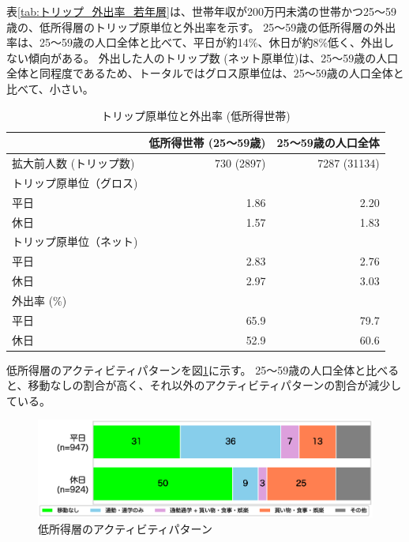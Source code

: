 \documentclass[a4paper,12pt, uplatex]{jsbook}
\begin{document}
表\ref{tab:トリップ_外出率_若年層}は、世帯年収が200万円未満の世帯かつ25〜59歳の、低所得層のトリップ原単位と外出率を示す。
25〜59歳の低所得層の外出率は、25〜59歳の人口全体と比べて、平日が約14\%、休日が約8\%低く、外出しない傾向がある。
外出した人のトリップ数 (ネット原単位)は、25〜59歳の人口全体と同程度であるため、トータルではグロス原単位は、25〜59歳の人口全体と比べて、小さい。
%
\begin{table}[H]
\centering
\caption{トリップ原単位と外出率 (低所得世帯)}
\label{tab:トリップ_外出率_低所得}
\begin{tabular}{lrr}
\toprule
& 低所得世帯 (25〜59歳) & 25〜59歳の人口全体 \\
\midrule
拡大前人数 (トリップ数) & 730 (2897) & 7287 (31134)\\
トリップ原単位（グロス) & & \\
\hspace{2em} 平日 & 1.86 & 2.20 \\
\hspace{2em} 休日 & 1.57 & 1.83 \\
トリップ原単位（ネット) & & \\
\hspace{2em} 平日 & 2.83 & 2.76 \\
\hspace{2em} 休日 & 2.97 & 3.03\\
外出率 (\%) & & \\
\hspace{2em} 平日 & 65.9 & 79.7\\
\hspace{2em} 休日 & 52.9 & 60.6\\
\bottomrule
\end{tabular}
\end{table}

低所得層のアクティビティパターンを図\ref{fig:activity_pattern_income}に示す。
25〜59歳の人口全体と比べると、移動なしの割合が高く、それ以外のアクティビティパターンの割合が減少している。
%
\begin{figure}[H]
    \centering
    \includegraphics[width=1.0\textwidth]{picture/activity_pattern_低所得.eps}
    \caption{低所得層のアクティビティパターン}
    \label{fig:activity_pattern_income}
\end{figure}
\end{document}
